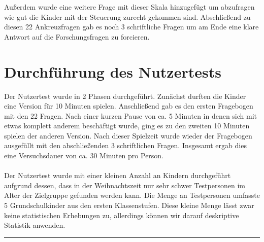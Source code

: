 Außerdem wurde eine weitere Frage mit dieser Skala hinzugefügt um abzufragen wie gut die Kinder mit der Steuerung zurecht gekommen sind. Abschließend zu diesen 22 Ankreuzfragen gab es noch 3 schriftliche Fragen um am Ende eine klare Antwort auf die Forschungsfragen zu forcieren. %
\section{Durchführung des Nutzertests} %
Der Nutzertest wurde in 2 Phasen durchgeführt. Zunächst durften die Kinder eine Version für 10 Minuten spielen. Anschließend gab es den ersten Fragebogen mit den 22 Fragen. Nach einer kurzen Pause von ca. 5 Minuten in denen sich mit etwas komplett anderem beschäftigt wurde, ging es zu den zweiten 10 Minuten spielen der anderen Version. Nach dieser Spielzeit wurde wieder der Fragebogen ausgefüllt mit den abschließenden 3 schriftlichen Fragen. Insgesamt ergab dies eine Versuchsdauer von ca. 30 Minuten pro Person.\\
\\
Der Nutzertest wurde mit einer kleinen Anzahl an Kindern durchgeführt aufgrund dessen, dass in der Weihnachtszeit nur sehr schwer Testpersonen im Alter der Zielgruppe gefunden werden kann. Die Menge an Testpersonen umfasste 5 Grundschulkinder aus den ersten Klassenstufen. Diese kleine Menge lässt zwar keine statistischen Erhebungen zu, allerdings können wir darauf deskriptive Statistik anwenden. 

\hfil\rule{0.4\textwidth}{0.4pt}